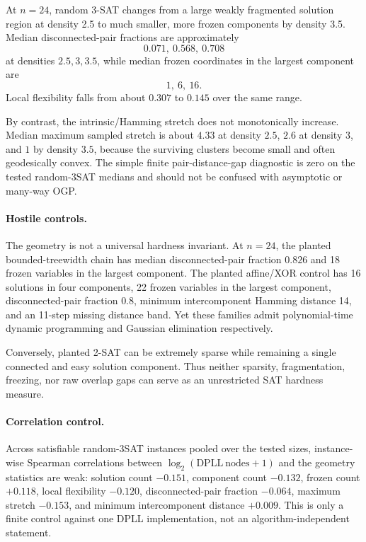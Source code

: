At $n=24$, random 3-SAT changes from a large weakly fragmented solution region at density
2.5 to much smaller, more frozen components by density 3.5. Median disconnected-pair
fractions are approximately
\[
0.071,\ 0.568,\ 0.708
\]
at densities $2.5,3,3.5$, while median frozen coordinates in the largest component are
\[
1,\ 6,\ 16.
\]
Local flexibility falls from about $0.307$ to $0.145$ over the same range.

By contrast, the intrinsic/Hamming stretch does not monotonically increase. Median maximum
sampled stretch is about $4.33$ at density $2.5$, $2.6$ at density $3$, and $1$ by density
$3.5$, because the surviving clusters become small and often geodesically convex. The
simple finite pair-distance-gap diagnostic is zero on the tested random-3SAT medians and
should not be confused with asymptotic or many-way OGP.

\paragraph{Hostile controls.}
The geometry is not a universal hardness invariant. At $n=24$, the planted bounded-treewidth
chain has median disconnected-pair fraction $0.826$ and 18 frozen variables in the largest
component. The planted affine/XOR control has 16 solutions in four components, 22 frozen
variables in the largest component, disconnected-pair fraction $0.8$, minimum intercomponent
Hamming distance 14, and an 11-step missing distance band. Yet these families admit
polynomial-time dynamic programming and Gaussian elimination respectively.

Conversely, planted 2-SAT can be extremely sparse while remaining a single connected and
easy solution component. Thus neither sparsity, fragmentation, freezing, nor raw overlap
gaps can serve as an unrestricted SAT hardness measure.

\paragraph{Correlation control.}
Across satisfiable random-3SAT instances pooled over the tested sizes, instance-wise Spearman
correlations between $\log_2(\mathrm{DPLL\ nodes}+1)$ and the geometry statistics are weak:
solution count $-0.151$, component count $-0.132$, frozen count $+0.118$, local flexibility
$-0.120$, disconnected-pair fraction $-0.064$, maximum stretch $-0.153$, and minimum
intercomponent distance $+0.009$. This is only a finite control against one DPLL
implementation, not an algorithm-independent statement.

